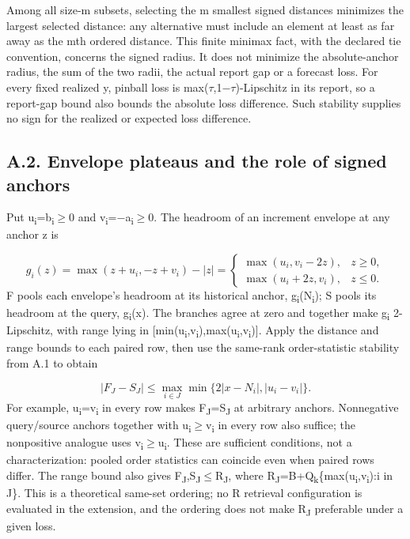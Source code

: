 \documentclass[10pt,a4paper]{article}
\begin{document}
Among all size-m subsets, selecting the m smallest signed distances minimizes the largest selected distance: any alternative must include an element at least as far away as the mth ordered distance. This finite minimax fact, with the declared tie convention, concerns the signed radius. It does not minimize the absolute-anchor radius, the sum of the two radii, the actual report gap or a forecast loss. For every fixed realized y, pinball loss is max(\(\tau\),1\(-\)\(\tau\))-Lipschitz in its report, so a report-gap bound also bounds the absolute loss difference. Such stability supplies no sign for the realized or expected loss difference.

\subsection*{A.2. Envelope plateaus and the role of signed anchors}
Put u\textsubscript{i}=b\textsubscript{i}\(\ge\)0 and v\textsubscript{i}=\(-\)a\textsubscript{i}\(\ge\)0. The headroom of an increment envelope at any anchor z is

\[
g_i(z)=\max(z+u_i,-z+v_i)-|z|=\begin{cases}\max(u_i,v_i-2z),&z\ge0,\\\max(u_i+2z,v_i),&z\le0.\end{cases}
\]
F pools each envelope's headroom at its historical anchor, g\textsubscript{i}(N\textsubscript{i}); S pools its headroom at the query, g\textsubscript{i}(x). The branches agree at zero and together make g\textsubscript{i} 2-Lipschitz, with range lying in [min(u\textsubscript{i},v\textsubscript{i}),max(u\textsubscript{i},v\textsubscript{i})]. Apply the distance and range bounds to each paired row, then use the same-rank order-statistic stability from A.1 to obtain

\[
|F_J-S_J|\le\max_{i\in J}\min\{2|x-N_i|,|u_i-v_i|\}.
\]
For example, u\textsubscript{i}=v\textsubscript{i} in every row makes F\textsubscript{J}=S\textsubscript{J} at arbitrary anchors. Nonnegative query/source anchors together with u\textsubscript{i}\(\ge\)v\textsubscript{i} in every row also suffice; the nonpositive analogue uses v\textsubscript{i}\(\ge\)u\textsubscript{i}. These are sufficient conditions, not a characterization: pooled order statistics can coincide even when paired rows differ. The range bound also gives F\textsubscript{J},S\textsubscript{J}\(\le\)R\textsubscript{J}, where R\textsubscript{J}=B+Q\textsubscript{k}\{max(u\textsubscript{i},v\textsubscript{i}):i in J\}. This is a theoretical same-set ordering; no R retrieval configuration is evaluated in the extension, and the ordering does not make R\textsubscript{J} preferable under a given loss.
\end{document}
